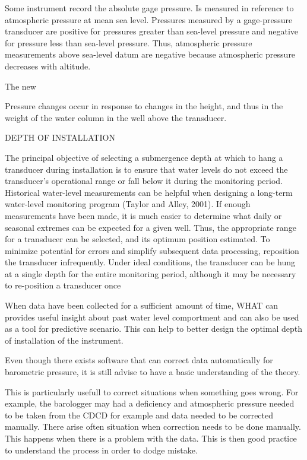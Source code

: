 \documentclass[12pt, letterpaper, fleqn]{report}
\begin{document}
Some instrument record the absolute gage pressure. Is measured in reference to atmospheric pressure at mean sea level. Pressures measured by a gage-pressure transducer are positive for pressures greater than sea-level pressure and negative for pressure less than sea-level pressure. Thus, atmospheric pressure measurements above sea-level datum are negative because atmospheric pressure decreases with altitude.

The new

Pressure changes occur in response to changes in the height, and thus in the weight of the water column in the well above the transducer.

DEPTH OF INSTALLATION

The principal objective of selecting a submergence depth at which to hang a transducer during installation is to ensure that water levels do not exceed the transducer’s operational range or fall below it during the monitoring period. Historical water-level measurements can be helpful when designing a long-term water-level monitoring program (Taylor and Alley, 2001). If enough measurements have been made, it is much easier to determine what daily or seasonal extremes can be expected for a given well. Thus, the appropriate range for a transducer can be selected, and its optimum position estimated. To minimize potential for errors and simplify subsequent data processing, reposition the transducer infrequently. Under ideal conditions, the transducer can be hung at a single depth for the entire monitoring period, although it may be necessary to re-position a transducer once

When data have been collected for a sufficient amount of time, WHAT can provides useful insight about past water level comportment and can also be used as a tool for predictive scenario. This can help to better design the optimal depth of installation of the instrument.
 
Even though there exists software that can correct data automatically for barometric pressure, it is still advise to have a basic understanding of the theory.


This is particularly usefull to correct situations when something goes wrong. For example, the barologger may had a deficiency and atmospheric pressure needed to be taken from the CDCD for example and data needed to be corrected manually. There arise often situation when correction needs to be done manually. This happens when there is a problem with the data. This is then good practice to understand the process in order to dodge mistake.
\end{document}
